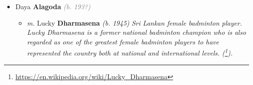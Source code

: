 \documentclass[10pt, openany]{book}
\begin{document}
\begin{itemize}
{\begin{itemize}
{\begin{itemize}
{\begin{itemize}
{\begin{itemize}
{\begin{itemize}
\item{Deshan Lester \textbf{Atapattu} \textcolor{slorange}{\textit{(b. 1963)}} \textcolor{slmaroon}{\textit{Facilities Management Profesional specializing in Relocations, Expansion \& Outsourcing (\footnote{\url{https://www.linkedin.com/in/deshan-atapattu-44a522b/}}).}}
\begin{itemize}
\item{\textit{m.} Ekayeni  R UNKNOWN \textbf{Unknown} \textcolor{slorange}{\textit{(b. 1965)}}   \label{couple:00003643:00003649} \begin{itemize}
\item{Ashley \textbf{Atapattu} \textcolor{gray}{\textit{(b. 199?)}} \textcolor{slmaroon}{\textit{Alumna of California State University, Northridge (\footnote{\url{https://www.linkedin.com/in/ashley-atapattu-53b589136/}}).}}
 }
\end{itemize}}
\end{itemize}
  }
\item{Sonali Manik \textbf{Atapattu} \textcolor{gray}{\textit{(b. 196?)}}
\begin{itemize}
\item{\textit{m.} Nilanka Jinesh \textbf{Perera} \textcolor{gray}{\textit{(b. 196?)}}   \label{couple:00003644:00003650} \begin{itemize}
\item{Brandon Jinesh \textbf{Perera} \textcolor{gray}{\textit{(b. 199?)}}
  }
\end{itemize}}
\end{itemize}
  }
\end{itemize}}
\end{itemize}
 }
\item{Daya \textbf{Alagoda} \textcolor{gray}{\textit{(b. 193?)}}
\begin{itemize}
\item{\textit{m.} Lucky \textbf{Dharmasena} \textcolor{slorange}{\textit{(b. 1945)}} \textcolor{slmaroon}{\textit{Sri Lankan female badminton player. Lucky Dharmasena is a former national badminton champion who is also regarded as one of the greatest female badminton players to have represented the country both at national and international levels. (\footnote{\url{https://en.wikipedia.org/wiki/Lucky_Dharmasena}}).}}   \label{couple:00003630:00003640} \begin{itemize}

\end{itemize}}
\end{itemize}}
\end{itemize}}
\end{itemize}}
\end{itemize}}
\end{itemize}
\end{document}
